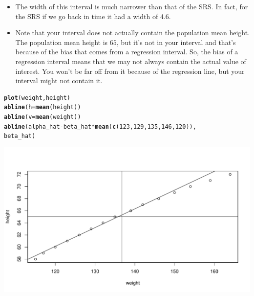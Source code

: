 \documentclass[oneside]{book}\usepackage[]{graphicx}\usepackage[dvipsnames,table,xcdraw]{xcolor}
\makeatletter
\def\maxwidth{ %
  \ifdim\Gin@nat@width>\linewidth
    \linewidth
  \else
    \Gin@nat@width
  \fi
}
\newcommand{\hlnum}[1]{\textcolor[rgb]{0.686,0.059,0.569}{#1}}%
\newcommand{\hlopt}[1]{\textcolor[rgb]{0,0,0}{#1}}%
\newcommand{\hlstd}[1]{\textcolor[rgb]{0.345,0.345,0.345}{#1}}%
\newcommand{\hlkwc}[1]{\textcolor[rgb]{0.333,0.667,0.333}{#1}}%
\newcommand{\hlkwd}[1]{\textcolor[rgb]{0.737,0.353,0.396}{\textbf{#1}}}%
\newenvironment{kframe}{%
 \def\at@end@of@kframe{}%
 \ifinner\ifhmode%
  \def\at@end@of@kframe{\end{minipage}}%
  \begin{minipage}{\columnwidth}%
 \fi\fi%
 \def\FrameCommand##1{\hskip\@totalleftmargin \hskip-\fboxsep
 \colorbox{shadecolor}{##1}\hskip-\fboxsep
     \hskip-\linewidth \hskip-\@totalleftmargin \hskip\columnwidth}%
 \MakeFramed {\advance\hsize-\width
   \@totalleftmargin\z@ \linewidth\hsize
   \@setminipage}}%
 {\par\unskip\endMakeFramed%
 \at@end@of@kframe}
\newenvironment{knitrout}{}{} %
\makeatother
\begin{document}
\begin{itemize}
    \item The width of this interval is much narrower than that of the SRS.
          In fact, for the SRS if we go back in time it had a width of 4.6.
    \item Note that your interval does not actually contain the population mean height.
          The population mean height is $65$, but it's not in your interval and that's
          because of the bias that comes from a regression interval. So, the bias of a regression
          interval means that we may not always
          contain the actual value of interest. You won't be far off from it because of
          the regression line, but your interval might not contain it.
\end{itemize}

\begin{knitrout}
\color{fgcolor}\begin{kframe}
\begin{alltt}
\hlkwd{plot}\hlstd{(weight, height)}
\hlkwd{abline}\hlstd{(}\hlkwc{h} \hlstd{=} \hlkwd{mean}\hlstd{(height))}
\hlkwd{abline}\hlstd{(}\hlkwc{v} \hlstd{=} \hlkwd{mean}\hlstd{(weight))}
\hlkwd{abline}\hlstd{(alpha_hat} \hlopt{-} \hlstd{beta_hat} \hlopt{*} \hlkwd{mean}\hlstd{(}\hlkwd{c}\hlstd{(}\hlnum{123}\hlstd{,} \hlnum{129}\hlstd{,} \hlnum{135}\hlstd{,} \hlnum{146}\hlstd{,} \hlnum{120}\hlstd{)),}
  \hlstd{beta_hat)}
\end{alltt}
\end{kframe}

{\centering \includegraphics[width=\maxwidth]{figure/unnamed-chunk-38-1} 

}


\end{knitrout}
\end{document}
